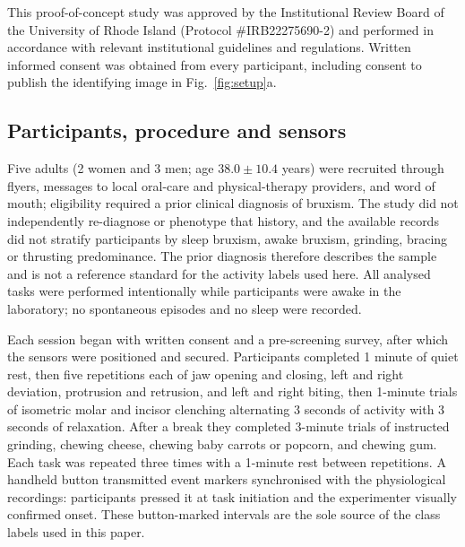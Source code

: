 \documentclass[pdflatex,sn-nature,iicol]{sn-jnl}
\begin{document}
This proof-of-concept study was approved by the Institutional Review Board of the University of Rhode Island (Protocol \#IRB22275690-2) and performed in accordance with relevant institutional guidelines and regulations. Written informed consent was obtained from every participant, including consent to publish the identifying image in Fig.~\ref{fig:setup}a.

\subsection{Participants, procedure and sensors}

Five adults (2 women and 3 men; age $38.0 \pm 10.4$ years) were recruited through flyers, messages to local oral-care and physical-therapy providers, and word of mouth; eligibility required a prior clinical diagnosis of bruxism. The study did not independently re-diagnose or phenotype that history, and the available records did not stratify participants by sleep bruxism, awake bruxism, grinding, bracing or thrusting predominance. The prior diagnosis therefore describes the sample and is not a reference standard for the activity labels used here. All analysed tasks were performed intentionally while participants were awake in the laboratory; no spontaneous episodes and no sleep were recorded.

Each session began with written consent and a pre-screening survey, after which the sensors were positioned and secured. Participants completed 1 minute of quiet rest, then five repetitions each of jaw opening and closing, left and right deviation, protrusion and retrusion, and left and right biting, then 1-minute trials of isometric molar and incisor clenching alternating 3 seconds of activity with 3 seconds of relaxation. After a break they completed 3-minute trials of instructed grinding, chewing cheese, chewing baby carrots or popcorn, and chewing gum. Each task was repeated three times with a 1-minute rest between repetitions. A handheld button transmitted event markers synchronised with the physiological recordings: participants pressed it at task initiation and the experimenter visually confirmed onset. These button-marked intervals are the sole source of the class labels used in this paper.
\end{document}
